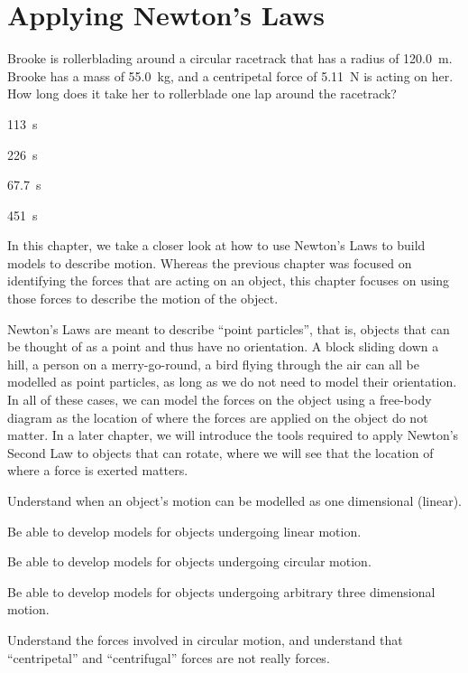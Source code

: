 
\chapter{Applying Newton's Laws}
\label{chap:ApplyingNewtonsLaws}

\begin{opening}
\begin{MCquestion}{Brooke is rollerblading around a circular racetrack that has a radius of \SI{120.0}{m}. Brooke has a mass of \SI{55.0}{kg}, and a centripetal force of \SI{5.11}{N} is acting on her. How long does it take her to rollerblade one lap around the racetrack? }
\item \SI{113}{s}
\item \SI{226}{s} %
\item \SI{67.7}{s}
\item \SI{451}{s}
\end{MCquestion}
\end{opening}

In this chapter, we take a closer look at how to use Newton's Laws to build models to describe motion. Whereas the previous chapter was focused on identifying the forces that are acting on an object, this chapter focuses on using those forces to describe the motion of the object.

Newton's Laws are meant to describe ``point particles'', that is, objects that can be thought of as a point and thus have no orientation. A block sliding down a hill, a person on a merry-go-round, a bird flying through the air can all be modelled as point particles, as long as we do not need to model their orientation. In all of these cases, we can model the forces on the object using a free-body diagram as the location of where the forces are applied on the object do not matter. In a later chapter, we will introduce the tools required to apply Newton's Second Law to objects that can rotate, where we will see that the location of where a force is exerted matters.

\vspace{1cm}
\begin{learningObjectives}
{
\item Understand when an object's motion can be modelled as one dimensional (linear).
\item Be able to develop models for objects undergoing linear motion.
\item Be able to develop models for objects undergoing circular motion.
\item Be able to develop models for objects undergoing arbitrary three dimensional motion.
\item Understand the forces involved in circular motion, and understand that ``centripetal'' and ``centrifugal'' forces are not really forces.
}
\end{learningObjectives}

